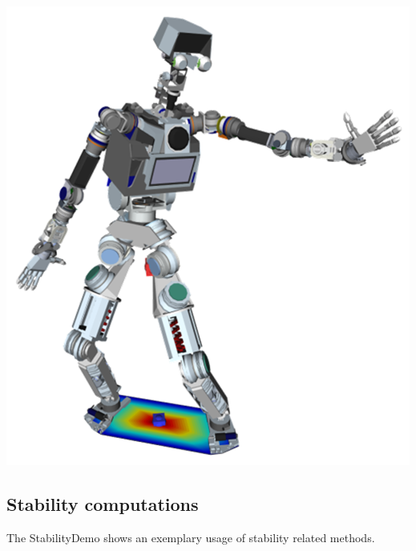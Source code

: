 \includegraphics[width=\textwidth]{HierarchicalIK}
\subsection{Stability computations}
The StabilityDemo shows an exemplary usage of stability related methods.\par

